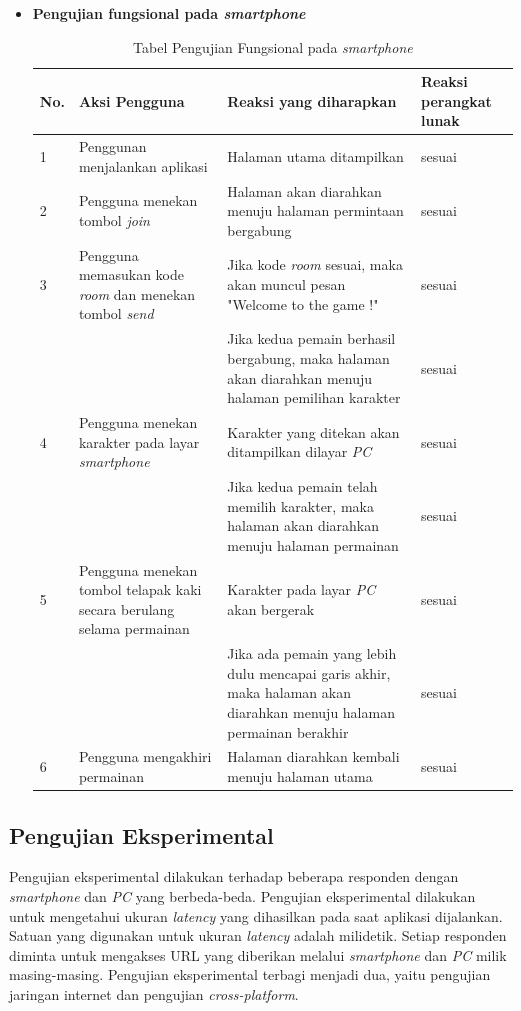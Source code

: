 \begin{itemize}
	\item \textbf{Pengujian fungsional pada \textit{smartphone}}
\begin{table}[H]
	\centering
	\caption{Tabel Pengujian Fungsional pada \textit{smartphone}}
	\begin{tabular}{|p{0.35cm}| p{3.5cm}| p{7cm}| p{2.5cm}|} \hline
		No. & Aksi Pengguna & Reaksi yang diharapkan & Reaksi perangkat lunak \\ \hline
		1 & Penggunan menjalankan aplikasi & Halaman utama ditampilkan & sesuai \\ \hline 
		2 & Pengguna menekan tombol \textit{join} & Halaman akan diarahkan menuju halaman permintaan bergabung & sesuai \\ \hline
		3 & Pengguna memasukan kode \textit{room} dan menekan tombol \textit{send} & Jika kode \textit{room} sesuai, maka akan muncul pesan "Welcome to the game !" & sesuai \\ \hline
		& & Jika kedua pemain berhasil bergabung, maka halaman akan diarahkan menuju halaman pemilihan karakter & sesuai \\ \hline
		4 & Pengguna menekan karakter pada layar \textit{smartphone} & Karakter yang ditekan akan ditampilkan dilayar \textit{PC} & sesuai \\ \hline
		& & Jika kedua pemain telah memilih karakter, maka halaman akan diarahkan menuju halaman permainan & sesuai \\ \hline
		5 & Pengguna menekan tombol telapak kaki secara berulang selama permainan & Karakter pada layar \textit{PC} akan bergerak & sesuai\\ \hline
		& & Jika ada pemain yang lebih dulu mencapai garis akhir, maka halaman akan diarahkan menuju halaman permainan berakhir & sesuai \\ \hline
		6 & Pengguna mengakhiri permainan & Halaman diarahkan kembali menuju halaman utama & sesuai \\ \hline
	\end{tabular}
	\label{table:fungsionalSmartphone}
\end{table}
\end{itemize} 
\subsection{Pengujian Eksperimental}
Pengujian eksperimental dilakukan terhadap beberapa responden dengan \textit{smartphone} dan \textit{PC} yang berbeda-beda. Pengujian eksperimental dilakukan untuk mengetahui ukuran \textit{latency} yang dihasilkan pada saat aplikasi dijalankan. Satuan yang digunakan untuk ukuran \textit{latency} adalah milidetik. Setiap responden diminta untuk mengakses URL yang diberikan melalui \textit{smartphone} dan \textit{PC} milik masing-masing. Pengujian eksperimental terbagi menjadi dua, yaitu pengujian jaringan internet dan pengujian \textit{cross-platform}.

